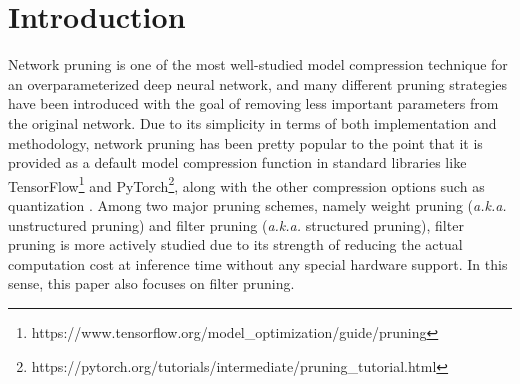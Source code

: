 \section{Introduction} \label{sec:intro}


Network pruning is one of the most well-studied model compression technique for an overparameterized deep neural network, and many different pruning strategies have been introduced with the goal of removing less important parameters from the original network. Due to its simplicity in terms of both implementation and methodology, network pruning has been pretty popular to the point that it is provided as a default model compression function in standard libraries like TensorFlow\footnote{https://www.tensorflow.org/model\_optimization/guide/pruning} and PyTorch\footnote{https://pytorch.org/tutorials/intermediate/pruning\_tutorial.html}, along with the other compression options such as quantization \cite{Coreset}. Among two major pruning schemes, namely weight pruning (\textit{a.k.a.} unstructured pruning) \cite{Lottery,Songhan,SNIP,Synaptic,OptimalPruning} and filter pruning (\textit{a.k.a.} structured pruning), filter pruning is more actively studied \cite{FPGM,Lasso,EagleEye,Rethinking,Thinet,DCP} due to its strength of reducing the actual computation cost at inference time without any special hardware support. In this sense, this paper also focuses on filter pruning.




